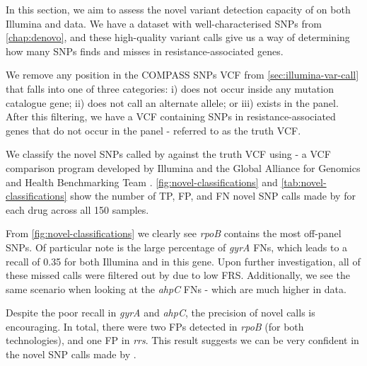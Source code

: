 In this section, we aim to assess the novel variant detection capacity of \drprg{} on both Illumina and \ont{} data. We have a dataset with well-characterised SNPs from \autoref{chap:denovo}, and these high-quality variant calls give us a way of determining how many SNPs \drprg{} finds and misses in resistance-associated genes. 

We remove any position in the COMPASS SNPs VCF from \autoref{sec:illumina-var-call} that falls into one of three categories: i) does not occur inside any mutation catalogue gene; ii) does not call an alternate allele; or iii) exists in the panel. After this filtering, we have a VCF containing SNPs in resistance-associated genes that do not occur in the panel - referred to as the truth VCF.

We classify the novel SNPs called by \drprg{} against the truth VCF using  - a VCF comparison program developed by Illumina and the Global Alliance for Genomics and Health Benchmarking Team \cite{happy2019}. \autoref{fig:novel-classifications} and \autoref{tab:novel-classifications} show the number of TP, FP, and FN novel SNP calls made by \drprg{} for each drug across all 150 samples. 

From \autoref{fig:novel-classifications} we clearly see \textit{rpoB} contains the most off-panel SNPs. Of particular note is the large percentage of \textit{gyrA} FNs, which leads to a recall of 0.35 for both Illumina and \ont{} in this gene. Upon further investigation, all of these missed calls were filtered out by \drprg{} due to low FRS. Additionally, we see the same scenario when looking at the \textit{ahpC} FNs - which are much higher in \ont{} data. 

Despite the poor recall in \textit{gyrA} and \textit{ahpC}, the precision of novel \drprg{} calls is encouraging. In total, there were two FPs detected in \textit{rpoB} (for both technologies), and one \ont{} FP in \textit{rrs}. This result suggests we can be very confident in the novel SNP calls made by \drprg{}.

